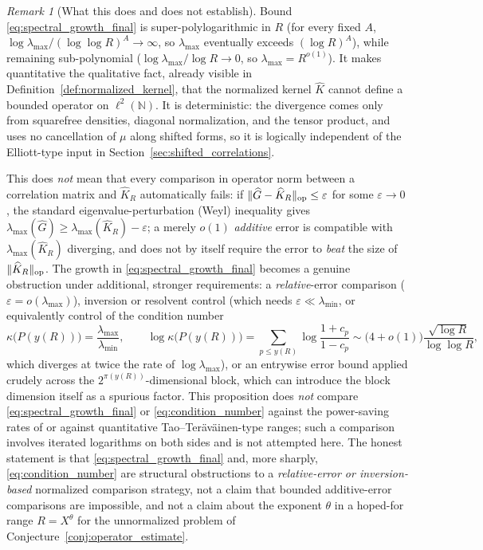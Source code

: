 \documentclass[11pt]{amsart}
\numberwithin{equation}{section}
\theoremstyle{plain}
\theoremstyle{definition}
\theoremstyle{remark}
\newtheorem{remark}[theorem]{Remark}
\newcommand{\N}{\mathbb N}
\newcommand{\mob}{\mu}
\begin{document}
\begin{remark}[What this does and does not establish]
\label{rem:spectral_growth_honest}
Bound \eqref{eq:spectral_growth_final} is super-polylogarithmic in \(R\) (for every fixed \(A\), \(\log\lambda_{\max}/(\log\log R)^A\to\infty\), so \(\lambda_{\max}\) eventually exceeds \((\log R)^A\)), while remaining sub-polynomial (\(\log\lambda_{\max}/\log R\to0\), so \(\lambda_{\max}=R^{o(1)}\)).  It makes quantitative the qualitative fact, already visible in Definition~\ref{def:normalized_kernel}, that the normalized kernel \(\widehat K\) cannot define a bounded operator on \(\ell^2(\N)\).  It is deterministic: the divergence comes only from squarefree densities, diagonal normalization, and the tensor product, and uses no cancellation of \(\mob\) along shifted forms, so it is logically independent of the Elliott-type input in Section~\ref{sec:shifted_correlations}.

This does \emph{not} mean that every comparison in operator norm between a correlation matrix and \(\widehat K_R\) automatically fails: if \(\|\widehat G-\widehat K_R\|_{\rm op}\le\varepsilon\) for some \(\varepsilon\to0\), the standard eigenvalue-perturbation (Weyl) inequality gives \(\lambda_{\max}(\widehat G)\ge\lambda_{\max}(\widehat K_R)-\varepsilon\); a merely \(o(1)\) \emph{additive} error is compatible with \(\lambda_{\max}(\widehat K_R)\) diverging, and does not by itself require the error to \emph{beat} the size of \(\|\widehat K_R\|_{\rm op}\).  The growth in \eqref{eq:spectral_growth_final} becomes a genuine obstruction under additional, stronger requirements: a \emph{relative}-error comparison (\(\varepsilon=o(\lambda_{\max})\)), inversion or resolvent control (which needs \(\varepsilon\ll\lambda_{\min}\), or equivalently control of the condition number
\begin{equation}
\kappa\bigl(P(y(R))\bigr)=\frac{\lambda_{\max}}{\lambda_{\min}},
\qquad
\log\kappa\bigl(P(y(R))\bigr)=\sum_{p\le y(R)}\log\frac{1+c_p}{1-c_p}\sim\bigl(4+o(1)\bigr)\frac{\sqrt{\log R}}{\log\log R},
\label{eq:condition_number}
\end{equation}
which diverges at twice the rate of \(\log\lambda_{\max}\)), or an entrywise error bound applied crudely across the \(2^{\pi(y(R))}\)-dimensional block, which can introduce the block dimension itself as a spurious factor.  This proposition does \emph{not} compare \eqref{eq:spectral_growth_final} or \eqref{eq:condition_number} against the power-saving rates of \cite{Pilatte2023} or against quantitative Tao--Ter\"av\"ainen-type ranges; such a comparison involves iterated logarithms on both sides and is not attempted here.  The honest statement is that \eqref{eq:spectral_growth_final} and, more sharply, \eqref{eq:condition_number} are structural obstructions to a \emph{relative-error or inversion-based} normalized comparison strategy, not a claim that bounded additive-error comparisons are impossible, and not a claim about the exponent \(\theta\) in a hoped-for range \(R=X^\theta\) for the unnormalized problem of Conjecture~\ref{conj:operator_estimate}.
\end{remark}
\end{document}

